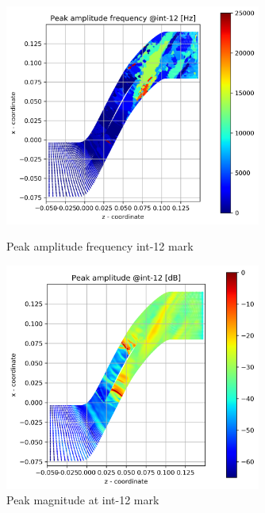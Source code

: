 \begin{figure}[ht]
  \centering
  \includegraphics[width=0.75\textwidth]{Figures/int-12-peak-freq.png}
  \caption{Peak amplitude frequency int-12 mark} \label{int-12-peak-freq}
  
  \vspace*{\floatsep}%

  \includegraphics[width=0.75\textwidth]{Figures/int-12-peak-mag.png}
  \caption{Peak magnitude at int-12 mark} \label{int-12-peak-mag}
\end{figure}

